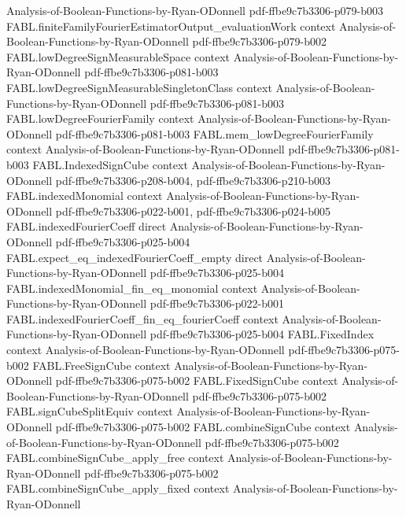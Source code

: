 \begin{theorem}
  {Analysis-of-Boolean-Functions-by-Ryan-ODonnell}
  {pdf-ffbe9c7b3306-p079-b003}
\proofstep
  {FABL.finiteFamilyFourierEstimatorOutput_evaluationWork}
  {context}
  {Analysis-of-Boolean-Functions-by-Ryan-ODonnell}
  {pdf-ffbe9c7b3306-p079-b002}
\proofstep
  {FABL.lowDegreeSignMeasurableSpace}
  {context}
  {Analysis-of-Boolean-Functions-by-Ryan-ODonnell}
  {pdf-ffbe9c7b3306-p081-b003}
\proofstep
  {FABL.lowDegreeSignMeasurableSingletonClass}
  {context}
  {Analysis-of-Boolean-Functions-by-Ryan-ODonnell}
  {pdf-ffbe9c7b3306-p081-b003}
\proofstep
  {FABL.lowDegreeFourierFamily}
  {context}
  {Analysis-of-Boolean-Functions-by-Ryan-ODonnell}
  {pdf-ffbe9c7b3306-p081-b003}
\proofstep
  {FABL.mem_lowDegreeFourierFamily}
  {context}
  {Analysis-of-Boolean-Functions-by-Ryan-ODonnell}
  {pdf-ffbe9c7b3306-p081-b003}
\proofstep
  {FABL.IndexedSignCube}
  {context}
  {Analysis-of-Boolean-Functions-by-Ryan-ODonnell}
  {pdf-ffbe9c7b3306-p208-b004,
    pdf-ffbe9c7b3306-p210-b003}
\proofstep
  {FABL.indexedMonomial}
  {context}
  {Analysis-of-Boolean-Functions-by-Ryan-ODonnell}
  {pdf-ffbe9c7b3306-p022-b001,
    pdf-ffbe9c7b3306-p024-b005}
\proofstep
  {FABL.indexedFourierCoeff}
  {direct}
  {Analysis-of-Boolean-Functions-by-Ryan-ODonnell}
  {pdf-ffbe9c7b3306-p025-b004}
\proofstep
  {FABL.expect_eq_indexedFourierCoeff_empty}
  {direct}
  {Analysis-of-Boolean-Functions-by-Ryan-ODonnell}
  {pdf-ffbe9c7b3306-p025-b004}
\proofstep
  {FABL.indexedMonomial_fin_eq_monomial}
  {context}
  {Analysis-of-Boolean-Functions-by-Ryan-ODonnell}
  {pdf-ffbe9c7b3306-p022-b001}
\proofstep
  {FABL.indexedFourierCoeff_fin_eq_fourierCoeff}
  {context}
  {Analysis-of-Boolean-Functions-by-Ryan-ODonnell}
  {pdf-ffbe9c7b3306-p025-b004}
\proofstep
  {FABL.FixedIndex}
  {context}
  {Analysis-of-Boolean-Functions-by-Ryan-ODonnell}
  {pdf-ffbe9c7b3306-p075-b002}
\proofstep
  {FABL.FreeSignCube}
  {context}
  {Analysis-of-Boolean-Functions-by-Ryan-ODonnell}
  {pdf-ffbe9c7b3306-p075-b002}
\proofstep
  {FABL.FixedSignCube}
  {context}
  {Analysis-of-Boolean-Functions-by-Ryan-ODonnell}
  {pdf-ffbe9c7b3306-p075-b002}
\proofstep
  {FABL.signCubeSplitEquiv}
  {context}
  {Analysis-of-Boolean-Functions-by-Ryan-ODonnell}
  {pdf-ffbe9c7b3306-p075-b002}
\proofstep
  {FABL.combineSignCube}
  {context}
  {Analysis-of-Boolean-Functions-by-Ryan-ODonnell}
  {pdf-ffbe9c7b3306-p075-b002}
\proofstep
  {FABL.combineSignCube_apply_free}
  {context}
  {Analysis-of-Boolean-Functions-by-Ryan-ODonnell}
  {pdf-ffbe9c7b3306-p075-b002}
\proofstep
  {FABL.combineSignCube_apply_fixed}
  {context}
  {Analysis-of-Boolean-Functions-by-Ryan-ODonnell}

\end{theorem}
